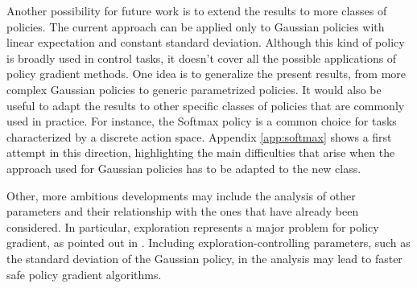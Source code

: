 Another possibility for future work is to extend the results to more classes of policies. The current approach can be applied only to Gaussian policies with linear expectation and constant standard deviation. Although this kind of policy is broadly used in control tasks, it doesn't cover all the possible applications of policy gradient methods. 
One idea is to generalize the present results, from more complex Gaussian policies to generic parametrized policies.
It would also be useful to adapt the results to other specific classes of policies that are commonly used in practice. For instance, the Softmax policy is a common choice for tasks characterized by a discrete action space. Appendix \ref{app:softmax} shows a first attempt in this direction, highlighting the main difficulties that arise when the approach used for Gaussian policies has to be adapted to the new class.

Other, more ambitious developments may include the analysis of other parameters and their relationship with the ones that have already been considered.
In particular, exploration represents a major problem for policy gradient, as pointed out in \cite{kakade2002approximately}. Including exploration-controlling parameters, such as the standard deviation of the Gaussian policy, in the analysis may lead to faster safe policy gradient algorithms.